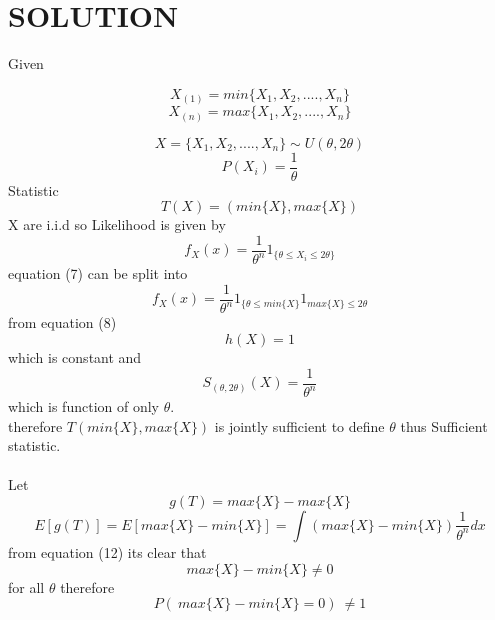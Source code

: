 \documentclass[journal,12pt,twocolumn]{IEEEtran}
\begin{document}
\section{\textbf{SOLUTION}}
Given

\begin{equation}
      X_{(1)} =min\{X_1,X_2,....,X_n\}
\end{equation}
\begin{equation}
    X_{(n)}=max\{X_1,X_2,....,X_n\}
\end{equation}

\begin{equation}
    X=\{X_1,X_2,....,X_n\}\sim U(\theta,2\theta)
\end{equation}
\begin{equation}
    P(X_i)=\dfrac{1}{\theta}
\end{equation}
Statistic
\begin{equation}
    T(X)=(min\{X\},max\{X\})
\end{equation}
X are i.i.d so Likelihood is given by 
\begin{equation}
    f_X(x)=\frac{1}{\theta^n}1_{\{\theta\leq X_i \leq2\theta\}}
\end{equation}
equation (7) can be split into
\begin{equation}
    f_X(x)=\frac{1}{\theta^n}1_{\{\theta\leq min\{X\}}1_{max\{ X\}\leq2\theta}
\end{equation}
from equation (8) 
\begin{equation}
    h(X)=1
\end{equation}
 which is constant and
\begin{equation}
    S_{(\theta,2\theta)}(X)=\frac{1}{\theta^n}
\end{equation}
 which is function of only $\theta$.\\
therefore $T(min\{X\},max\{X\})$ is jointly sufficient to define $\theta$ thus Sufficient statistic.\\ \\
Let 
\begin{equation}
     g(T)=max\{X\}-max\{X\}
\end{equation}
\begin{equation}
    E[g(T)]=E[max\{X\}-min\{X\}]=\int (max\{X\}-min\{X\})\frac{1}{\theta^n}dx
\end{equation}
from equation (12) its clear that
\begin{equation}
    max\{X\}-min\{X\}\neq0
\end{equation}
for all $\theta$ therefore 
\begin{equation}
    P(\ max\{X\}-min\{X\}=0 )\ \neq1
\end{equation}
\end{document}
